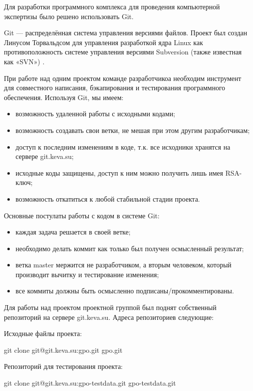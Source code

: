 Для разработки программного комплекса для проведения компьютерной экспертизы было решено использовать Git.

Git --- распределённая система управления версиями файлов. Проект был создан Линусом Торвальдсом для управления разработкой ядра Linux  как противоположность  системе управления версиями Subversion (также известная как «SVN») \cite{progit}.

При работе над одним проектом команде разработчикоа необходим инструмент для совместного написания, бэкапирования и тестирования программного обеспечения. Используя Git, мы имеем:
\begin{itemize}
\item возможность удаленной работы с исходными кодами;
\item возможность создавать свои ветки, не мешая при этом другим разработчикам;
\item доступ к последним изменениям в коде, т.к. все исходники хранятся на сервере git.keva.su;
\item исходные коды защищены, доступ к ним можно получить лишь имея RSA-ключ;
\item возможность откатиться к любой стабильной стадии проекта.
\end{itemize}

Основные постулаты работы с кодом в системе Git:

\begin{itemize}
\item каждая задача решается в своей ветке;
\item необходимо делать коммит как только был получен осмысленный результат;
\item ветка master мержится не разработчиком, а вторым человеком, который производит вычитку и тестирование изменения;
\item все коммиты должны быть осмысленно подписаны/прокомментированы.
\end{itemize}

Для работы над проектом проектной группой был поднят собственный репозиторий на сервере git.keva.su.
Адреса репозиториев следующие:

Исходные файлы проекта:

git clone git@git.keva.su:gpo.git gpo.git

Репозиторий для тестирования проекта:

git clone git@git.keva.su:gpo-testdata.git gpo-testdata.git
